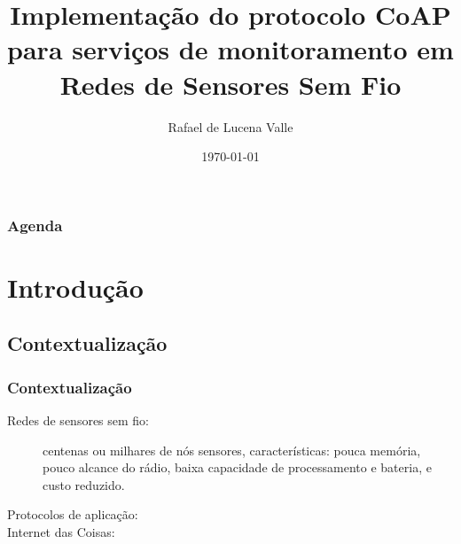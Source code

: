 \documentclass{beamer}
\title[CoAP]{Implementa\c{c}\~ao do protocolo CoAP para servi\c{c}os de monitoramento em Redes de Sensores Sem Fio} %
\author{Rafael de Lucena Valle} %
\institute[UFSC] %
{
Universidade Federal de Santa Catarina \\ %
\medskip
\textit{rafaeldelucena@inf.ufsc.br} %
}
\date{\today} %
\begin{document}
\begin{frame}
\titlepage %
\end{frame}

\begin{frame}
\frametitle{Agenda} %
\tableofcontents %
\end{frame}


\section{Introdu\c{c}\~ao} %

\subsection{Contextualização}
\begin{frame}
\frametitle{Contextualização}
\begin{description}
\item[Redes de sensores sem fio:] centenas ou milhares de n\'os sensores, caracter\'isticas: pouca mem\'oria, pouco alcance do r\'adio, baixa capacidade de processamento e bateria, e custo reduzido.
\item[Protocolos de aplicação:]
\item[Internet das Coisas:]
\end{description}
\end{frame}
\end{document}
